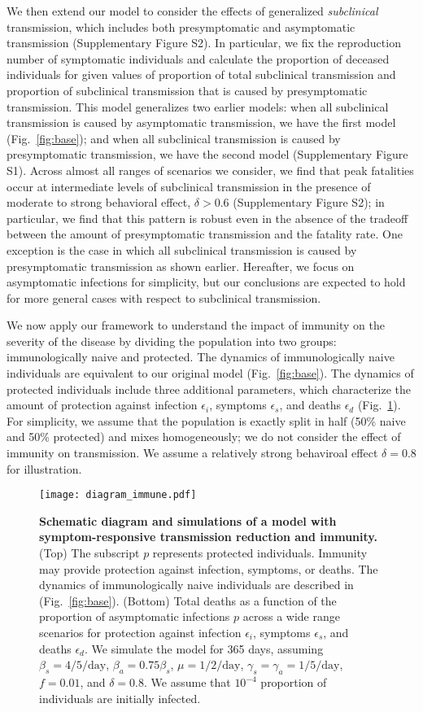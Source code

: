 \documentclass[12pt]{article}
\newcommand{\fref}[1]{Fig.~\ref{fig:#1}}
\begin{document}
We then extend our model to consider the effects of generalized \textit{subclinical} transmission, which includes both presymptomatic and asymptomatic transmission (Supplementary Figure S2).
In particular, we fix the reproduction number of symptomatic individuals and calculate the proportion of deceased individuals for given values of proportion of total subclinical transmission and proportion of subclinical transmission that is caused by presymptomatic transmission.
This model generalizes two earlier models:
when all subclinical transmission is caused by asymptomatic transmission, we have the first model (\fref{base});
and when all subclinical transmission is caused by presymptomatic transmission, we have the second model (Supplementary Figure S1).
Across almost all ranges of scenarios we consider, we find that peak fatalities occur at intermediate levels of subclinical transmission in the presence of moderate to strong behavioral effect, $\delta > 0.6$ (Supplementary Figure S2);
in particular, we find that this pattern is robust even in the absence of the tradeoff between the amount of presymptomatic transmission and the fatality rate.
One exception is the case in which all subclinical transmission is caused by presymptomatic transmission as shown earlier.
Hereafter, we focus on asymptomatic infections for simplicity, but our conclusions are expected to hold for more general cases with respect to subclinical transmission.

We now apply our framework to understand the impact of immunity on the severity of the disease by dividing the population into two groups: immunologically naive and protected.
The dynamics of immunologically naive individuals are equivalent to our original model (\fref{base}).
The dynamics of protected individuals include three additional parameters, which characterize the amount of protection against infection $\epsilon_i$, symptoms $\epsilon_s$, and deaths $\epsilon_d$ (\fref{immune}).
For simplicity, we assume that the population is exactly split in half (50\% naive and 50\% protected) and mixes homogeneously; we do not consider the effect of immunity on transmission.
We assume a relatively strong behaviroal effect $\delta=0.8$ for illustration.

\begin{figure}[!ht]
\texttt{[image: diagram\_immune.pdf]}
\caption{
\textbf{Schematic diagram and simulations of a model with symptom-responsive transmission reduction and immunity.}
(Top) The subscript $p$ represents protected individuals. 
Immunity may provide protection against infection, symptoms, or deaths.
The dynamics of immunologically naive individuals are described in (\fref{base}).
(Bottom) Total deaths as a function of the proportion of asymptomatic infections $p$ across a wide range scenarios for protection against infection $\epsilon_i$, symptoms $\epsilon_s$, and deaths $\epsilon_d$.
We simulate the model for 365 days, assuming $\beta_s = 4/5/\mathrm{day}$, $\beta_a = 0.75 \beta_s$, $\mu=1/2/\mathrm{day}$, $\gamma_s=\gamma_a=1/5/\mathrm{day}$, $f=0.01$, and $\delta=0.8$.
We assume that $10^{-4}$ proportion of individuals are initially infected.
}
\label{fig:immune}
\end{figure}
\end{document}
